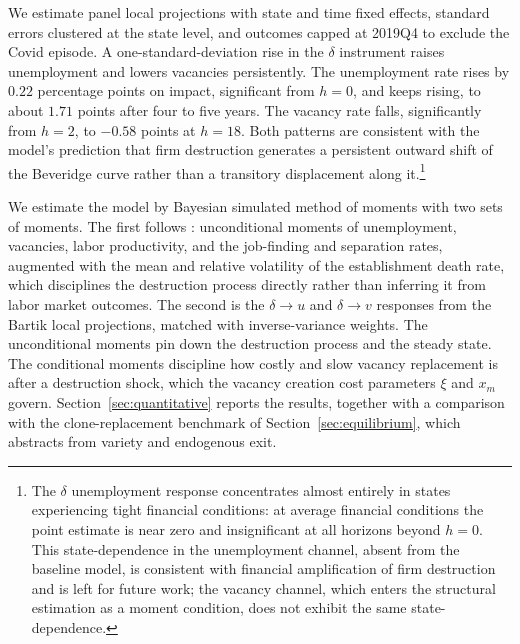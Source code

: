 \documentclass[authoryear, review, 12pt]{elsarticle}
\begin{document}
	We estimate panel local projections \citep{jorda_2005} with state and time fixed effects, 
	standard errors clustered at the state level, and outcomes capped 
	at 2019Q4 to exclude the Covid episode. A one-standard-deviation rise in the $\delta$
	instrument raises unemployment and lowers vacancies persistently. The unemployment rate
	rises by $0.22$ percentage points on impact, significant from $h=0$, and keeps rising,
	to about $1.71$ points after four to five years. The vacancy rate falls, significantly
	from $h=2$, to $-0.58$ points at $h=18$. Both patterns are consistent with the model's prediction that firm
	destruction generates a persistent outward shift of the Beveridge 
	curve rather than a transitory displacement along it.\footnote{The $\delta$ unemployment response concentrates almost entirely in states experiencing tight 
		financial conditions: at average financial conditions the point 
		estimate is near zero and insignificant at all horizons beyond 
		$h=0$. This state-dependence in the unemployment channel, absent 
		from the baseline model, is consistent with financial 
		amplification of firm destruction and is left for future work; 
		the vacancy channel, which enters the structural estimation as a 
		moment condition, does not exhibit the same state-dependence.}
	
	We estimate the model by Bayesian simulated method of moments with two sets of moments.
	The first follows \citet{coles_2018}: unconditional moments of unemployment, vacancies,
	labor productivity, and the job-finding and separation rates, augmented with the mean and
	relative volatility of the establishment death rate, which disciplines the destruction
	process directly rather than inferring it from labor market outcomes. The second is the
	$\delta\to u$ and $\delta\to v$ responses from the Bartik local projections, matched with
	inverse-variance weights. The unconditional moments pin down the destruction process and
	the steady state. The conditional moments discipline how costly and slow vacancy
	replacement is after a destruction shock, which the vacancy creation cost parameters $\xi$
	and $x_m$ govern. Section~\ref{sec:quantitative} reports the results, together with a comparison
	with the clone-replacement benchmark of Section~\ref{sec:equilibrium}, which abstracts
	from variety and endogenous exit.
	
\end{document}
